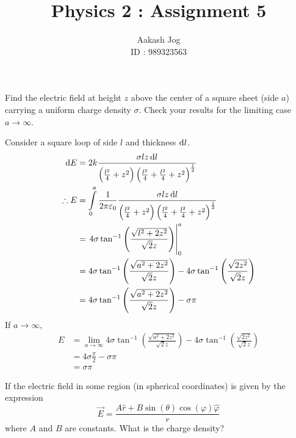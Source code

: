 \documentclass[fleqn, a4paper, 11pt, oneside]{amsart}
\title{Physics 2 : Assignment 5}
\author
{
	Aakash Jog\\
	ID : 989323563
}
\date{\formatdate{3}{5}{2015}}
\theoremstyle{definition}
\theoremstyle{theorem}
\begin{document}
\maketitle

\begin{question}
	Find the electric field at height $z$ above the center of a square sheet (side $a$) carrying a uniform charge density $\sigma$.
	Check your results for the limiting case $a \to \infty$.
\end{question}

\begin{solution}
	Consider a square loop of side $l$ and thickness $\dif l$.\\
	\begin{align*}
		\dif E &= 2 k \frac{\sigma l z \dif l}{\left( \frac{l^2}{4} + z^2 \right) \left( \frac{l^2}{4} + \frac{l^2}{4} + z^2 \right)^{\frac{1}{2}}}\\
		\therefore E &= \int\limits_{0}^{a} \frac{1}{2 \pi \varepsilon_0} \frac{\sigma l z \dif l}{\left( \frac{l^2}{4} + z^2 \right) \left( \frac{l^2}{4} + \frac{l^2}{4} + z^2 \right)^{\frac{1}{2}}}\\
		&= \left. 4 \sigma  \tan^{-1} \left( \frac{\sqrt{l^2 + 2 z^2}}{\sqrt{2} z} \right) \right|_{0}^{a}\\
		&= 4 \sigma \tan^{-1}\left( \frac{\sqrt{a^2 + 2 z^2}}{\sqrt{2} z} \right) - 4 \sigma \tan^{-1}\left( \frac{\sqrt{2 z^2}}{\sqrt{2} z} \right)\\
		&= 4 \sigma \tan^{-1}\left( \frac{\sqrt{a^2 + 2 z^2}}{\sqrt{2} z} \right) - \sigma \pi
	\end{align*}
	If $a \to \infty$,
	\begin{align*}
		E &= \lim\limits_{a \to \infty} 4 \sigma \tan^{-1}\left( \frac{\sqrt{a^2 + 2 z^2}}{\sqrt{2} z} \right) - 4 \sigma \tan^{-1}\left( \frac{\sqrt{2 z^2}}{\sqrt{2} z} \right)\\
		&= 4 \sigma \frac{\pi}{2} - \sigma \pi\\
		&= \sigma \pi
	\end{align*}
\end{solution}

\begin{question}
	If the electric field in some region (in spherical coordinates) is given by the expression
	\begin{equation*}
		\overrightarrow{E} = \frac{A \hat{r} + B \sin(\theta) \cos(\varphi) \hat{\varphi}}{r}
	\end{equation*}
	where $A$ and $B$ are constants.
	What is the charge density?
\end{question}
\end{document}

